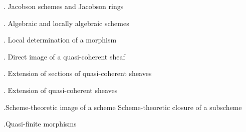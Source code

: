 \noindent{}. Jacobson schemes and Jacobson rings\dotfill

\noindent{}. Algebraic and locally algebraic schemes\dotfill

\noindent{}. Local determination of a morphism\dotfill

\noindent{}. Direct image of a quasi-coherent sheaf\dotfill

\noindent{}. Extension of sections of quasi-coherent sheaves

\noindent{}. Extension of quasi-coherent sheaves\dotfill

\noindent{}.Scheme-theoretic image of a scheme Scheme-theoretic closure of a subscheme\dotfill

\noindent{}.Quasi-finite morphisms\dotfill

\clearpage
